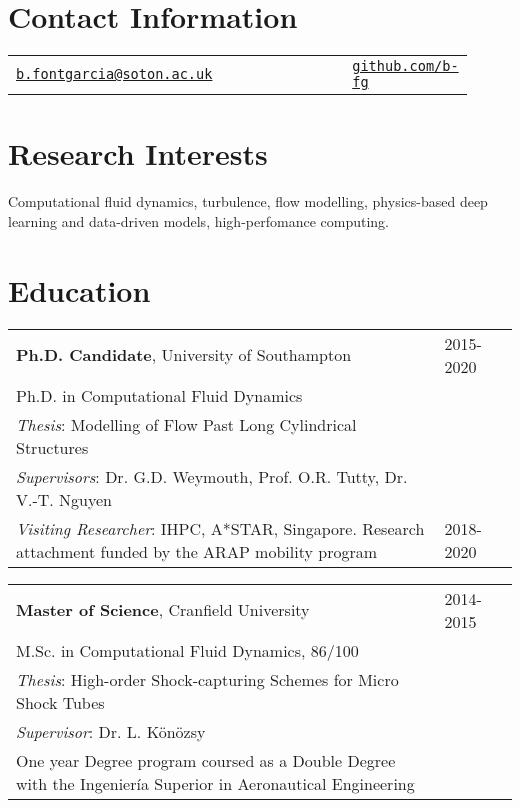 \documentclass[margin,line,pifont,palatino,courier]{res}
\begin{document}
\begin{resume}
\section{\sc Contact Information}
\vspace{.05in}

\begin{tabular}{@{}p{0.76\linewidth}p{0.15\linewidth}}
\href{mailto:b.fontgarcia@soton.ac.uk}{\texttt{b.fontgarcia@soton.ac.uk}} & \href{https://github.com/b-fg}{\texttt{github.com/b-fg}} \\
\end{tabular}

\section{\sc Research Interests}
Computational fluid dynamics, turbulence, flow modelling, physics-based deep learning and data-driven models, high-perfomance computing. 

\section{\sc Education}
\begin{tabular}{@{}p{0.85\linewidth}p{0.15\linewidth}}
\textbf{Ph.D. Candidate}, University of Southampton & 2015-2020\\ 
\hspace*{1em}Ph.D. in Computational Fluid Dynamics &\\
\hspace*{1em}\textit{Thesis}: Modelling of Flow Past Long Cylindrical Structures&\\
\hspace*{1em}\textit{Supervisors}: Dr. G.D. Weymouth, Prof. O.R. Tutty, Dr. V.-T. Nguyen&\\
\hspace*{1em}\textit{Visiting Researcher}: IHPC, A*STAR, Singapore. Research attachment funded by the ARAP mobility
program & 2018-2020
\end{tabular}

\begin{tabular}{@{}p{0.85\linewidth}p{0.15\linewidth}}
\textbf{Master of Science}, Cranfield University & 2014-2015\\ 
\hspace*{1em}M.Sc. in Computational Fluid Dynamics, 86/100 &\\
\hspace*{1em}\textit{Thesis}: High-order Shock-capturing Schemes for Micro Shock Tubes&\\
\hspace*{1em}\textit{Supervisor}: Dr. L. K\"{o}n\"{o}zsy&\\
\hspace*{1em}One year Degree program coursed as a Double Degree with the Ingenier\'{i}a Superior in
Aeronautical Engineering
\end{tabular}


\end{resume}
\end{document}
